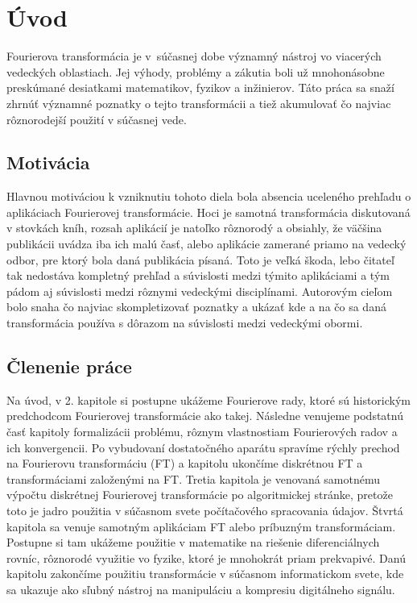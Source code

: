 \chapter{Úvod}

Fourierova transformácia je v~súčasnej dobe významný nástroj vo
viacerých vedeckých oblastiach. Jej výhody, problémy a zákutia boli už
mnohonásobne preskúmané desiatkami matematikov, fyzikov a inžinierov.
Táto práca sa snaží zhrnúť významné poznatky o tejto transformácii a
tiež akumulovať čo najviac rôznorodejší použití v súčasnej vede.

\section{Motivácia}
Hlavnou motiváciou k vzniknutiu tohoto diela bola absencia uceleného
prehľadu o aplikáciach Fourierovej transformácie. Hoci je samotná
transformácia diskutovaná v stovkách kníh, rozsah aplikácií je natoľko
rôznorodý a obsiahly, že väčšina publikácii uvádza iba ich malú časť,
alebo aplikácie zamerané priamo na vedecký odbor, pre ktorý bola daná
publikácia písaná. Toto je veľká škoda, lebo čitateľ tak nedostáva
kompletný prehľad a súvislosti medzi týmito aplikáciami a tým
pádom aj súvislosti medzi rôznymi vedeckými disciplínami. Autorovým
cieľom bolo snaha čo najviac skompletizovať poznatky a ukázať kde a
na čo sa daná transformácia používa s dôrazom na súvislosti medzi
vedeckými obormi.

\section{Členenie práce}
Na úvod, v 2. kapitole si postupne ukážeme Fourierove rady, ktoré sú
historickým predchodcom Fourierovej transformácie ako takej. Následne
venujeme podstatnú časť kapitoly formalizácii problému, rôznym
vlastnostiam Fourierových radov a ich konvergencii. Po vybudovaní
dostatočného aparátu spravíme rýchly prechod na Fourierovu
transformáciu (FT) a kapitolu ukončíme diskrétnou FT a 
transformáciami založenými na FT.
Tretia kapitola je venovaná samotnému výpočtu diskrétnej Fourierovej
transformácie po algoritmickej stránke, pretože toto je jadro použitia
v súčasnom svete počítačového spracovania údajov.
Štvrtá kapitola sa venuje samotným aplikáciam FT alebo príbuzným
transformáciam. Postupne si tam ukážeme použitie v matematike na riešenie
diferenciálnych rovníc, rôznorodé využitie vo fyzike, ktoré je
mnohokrát priam prekvapivé. Danú kapitolu zakončíme použitiu
transformácie v súčasnom informatickom svete, kde sa ukazuje ako
sľubný nástroj na manipuláciu a kompresiu digitálneho signálu.
